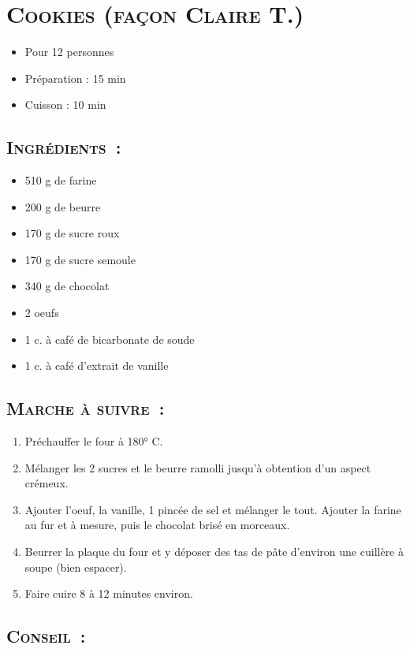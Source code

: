\section[\normalsize{Cookies (fa\c con Claire T.)}]{\LARGE{\textsc{Cookies (fa\c con Claire T.)}}}		%


\begin{itemize}
\item Pour 12 personnes
\item Préparation : 15 min
\item Cuisson : 10 min
\end{itemize}

\subsection*{\textsc{Ingr\'edients~:}}

\begin{itemize}
\item 510 g de farine
\item 200 g de beurre
\item 170 g de sucre roux
\item 170 g de sucre semoule
\item 340 g de chocolat
\item 2 oeufs
\item 1 c. \`a caf\'e de bicarbonate de soude
\item 1 c. \`a caf\'e d'extrait de vanille
\end{itemize}


\subsection*{\textsc{Marche \`a suivre~:}}

\begin{enumerate}
\item Pr\'echauffer le four \`a 180° C.
\item M\'elanger les 2 sucres et le beurre ramolli jusqu'\`a 
obtention d'un aspect cr\'emeux.
\item Ajouter l'oeuf, la vanille, 1 pinc\'ee de sel et m\'elanger 
le tout. Ajouter la farine au fur et \`a mesure, puis le chocolat 
bris\'e en morceaux.
\item Beurrer la plaque du four et y d\'eposer des tas de p\^ate 
d'environ une cuill\`ere \`a soupe (bien espacer).
\item Faire cuire 8 \`a 12 minutes environ.
\end{enumerate}
\subsection*{\textsc{Conseil~:}}
